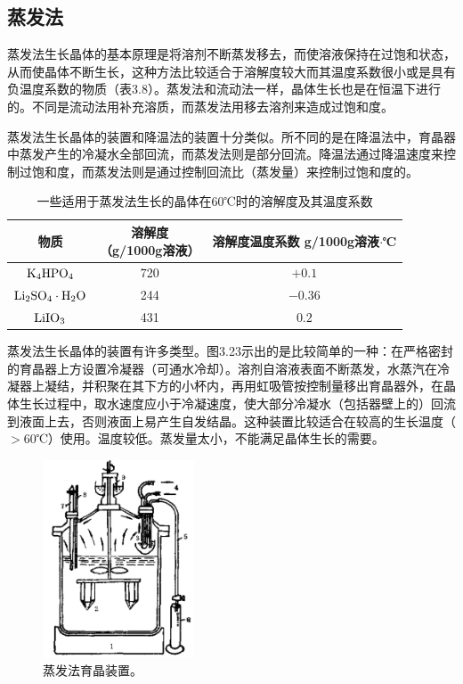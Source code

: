 ﻿\subsection{蒸发法}
蒸发法生长晶体的基本原理是将溶剂不断蒸发移去，而使溶液保持在过饱和状态，从而使晶体不断生长，这种方法比较适合于溶解度较大而其温度系数很小或是具有负温度系数的物质（表3.8）。蒸发法和流动法一样，晶体生长也是在恒温下进行的。不同是流动法用补充溶质，而蒸发法用移去溶剂来造成过饱和度。

蒸发法生长晶体的装置和降温法的装置十分类似。所不同的是在降温法中，育晶器中蒸发产生的冷凝水全部回流，而蒸发法则是部分回流。降温法通过降温速度来控制过饱和度，而蒸发法则是通过控制回流比（蒸发量）来控制过饱和度的。

\begin{table}[h]
\centering
\caption{一些适用于蒸发法生长的晶体在60℃时的溶解度及其温度系数}
\begin{tabular}{c|c|c}\toprule
物质 & \tabincell{c}{溶解度\\（g/1000g溶液）} & \tabincell{c}{溶解度温度系数\\g/1000g溶液$\cdot$℃}\\\hline
$\rm K_4HPO_4$ & 720 & $+0.1$\\
$\rm Li_2SO_4\cdot H_2O$ & 244 & $-0.36$\\
$\rm LiIO_3$ & 431 & $0.2$\\
\bottomrule
\end{tabular}
\end{table}

蒸发法生长晶体的装置有许多类型。图3.23示出的是比较简单的一种：在严格密封的育晶器上方设置冷凝器（可通水冷却）。溶剂自溶液表面不断蒸发，水蒸汽在冷凝器上凝结，并积聚在其下方的小杯内，再用虹吸管按控制量移出育晶器外，在晶体生长过程中，取水速度应小于冷凝速度，使大部分冷凝水（包括器壁上的）回流到液面上去，否则液面上易产生自发结晶。这种装置比较适合在较高的生长温度（$>$60℃）使用。温度较低。蒸发量太小，不能满足晶体生长的需要。

\begin{figure}[htb]
 \centering
 \includegraphics[width=0.4\textwidth]{fig/cp03/img3.23.jpg}
 \caption{蒸发法育晶装置。}
\end{figure}

